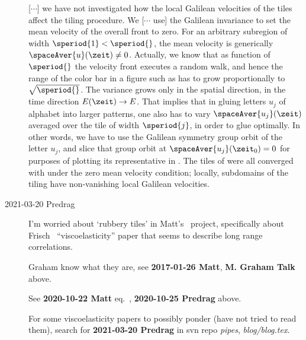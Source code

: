 \begin{description}
[$\cdots$] we have
not investigated how
the local Galilean velocities
of the tiles affect
the tiling procedure. We [$\cdots$ use]  the
Galilean invariance  to set the mean velocity of
the overall front to zero.
For an arbitrary subregion of width $\speriod{1}< \speriod{}$, the
mean velocity is generically $\spaceAver{u}(\zeit)\neq0$. Actually, we
know that as function of $\speriod{}$ the velocity front executes a
random walk,
and hence the range of the color bar in a figure such
as  has to grow proportionally to
$\sqrt{\speriod{}}$. The variance grows only in the spatial direction, in
the time direction $E(\zeit)\to{E}$.
That implies that in gluing letters $u_j$ of alphabet
 into larger patterns, one also has to vary
$\spaceAver{u_j}(\zeit)$ averaged over the tile of width $\speriod{j}$,
in order to glue optimally. In other words, we have to use the Galilean
symmetry group orbit of the letter $u_j$, and slice that group orbit at
$\spaceAver{u_j}(\zeit_0)=0$ for purposes of plotting its representative
in . The tiles of  were all converged
with under the zero mean velocity condition; locally, subdomains of
the tiling have non-vanishing local Galilean velocities.


\item[2021-03-20 Predrag]
I'm worried about `rubbery tiles' in Matt's \KS\ project, specifically
about Frisch \etal\ ``viscoelasticity'' paper that seems to
describe long range correlations.

Graham know what they are, see {\bf 2017-01-26 Matt}, {\bf M. Graham Talk}
above.

See
{\bf 2020-10-22 Matt} eq.~, {\bf 2020-10-25 Predrag}
above.

For some viscoelasticity
papers to possibly ponder (have not tried to read them), search for
{\bf 2021-03-20 Predrag} in svn repo \emph{pipes}, \emph{blog/blog.tex}.


\end{description}
